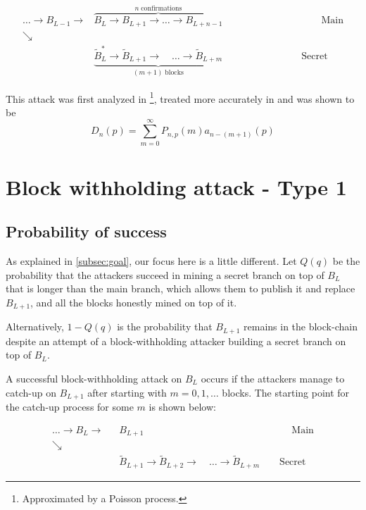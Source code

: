 \documentclass[letterpaper,12pt]{report}
\theoremstyle{plain}
\theoremstyle{definition}
\begin{document}
\begin{eqnarray}\label{dsfigure}
 \dots \rightarrow \mathit{B}_{L-1}\rightarrow &\overbrace{\mathit{B}_{L}\rightarrow\mathit{B}_{L+1}
\rightarrow\dots\rightarrow\mathit{B}_{L+n-1}}^{n \; \mathrm{confirmations}} \qquad\qquad\qquad\qquad\qquad \mathrm{Main}\\\nonumber
\searrow & \\\nonumber
\qquad \qquad \qquad & \underbrace{\widetilde{\mathit{B}}_{L}^{*}\rightarrow\widetilde{\mathit{B}}_{L+1}
\longrightarrow \quad \dots \longrightarrow\widetilde{\mathit{B}}_{L+m}}_{(m+1)\; \mathrm{ blocks}}\qquad\qquad\qquad\qquad \mathrm{Secret}
\end{eqnarray}

This attack was first analyzed in \cite{Bitcoin}\footnote{Approximated by a Poisson process.}, treated more accurately in \cite{Doublespend} and was shown to be 
\begin{equation}\label{eqn:ds}
D_n(p)=\sum_{m=0}^{\infty}P_{n,p}(m)\mathit{a}_{n-(m+1)}(p)
\end{equation}

\section{Block withholding attack - Type 1}

\subsection{Probability of success}\label{probabilityofsuccess}

As explained in \ref{subsec:goal}, our focus here is a little different. 
Let $\mathit{Q}(q)$  be the probability that the attackers succeed in mining a secret branch on top of $\mathit{B}_L$ that is longer than the main branch, which allows them to publish it and replace $\mathit{B}_{L+1}$, and all the blocks honestly mined on top of it. 

Alternatively, $1-\mathit{Q}(q)$ is the probability that $\mathit{B}_{L+1}$ remains in the block-chain despite an attempt of a block-withholding attacker building a secret branch on top of $\mathit{B}_L$.

A successful block-withholding attack on $\mathit{B}_L$ occurs if the attackers manage to catch-up on $B_{L+1}$ after starting with $m=0,1,\dots$ blocks. The starting point for the catch-up process for some $m$ is shown below:

\begin{eqnarray}\label{blockwithholdingboundary}
 \dots \rightarrow \mathit{B}_L\rightarrow &\mathit{B}_{L+1} \qquad\qquad\qquad\qquad\qquad\qquad\qquad\quad \mathrm{Main}\\\nonumber
\searrow & \\\nonumber
\qquad \qquad \qquad & \widetilde{\mathit{B}}_{L+1}\rightarrow\widetilde{\mathit{B}}_{L+2}
\longrightarrow \quad \dots \longrightarrow\widetilde{\mathit{B}}_{L+m}\qquad \mathrm{Secret}
\end{eqnarray}
\end{document}
